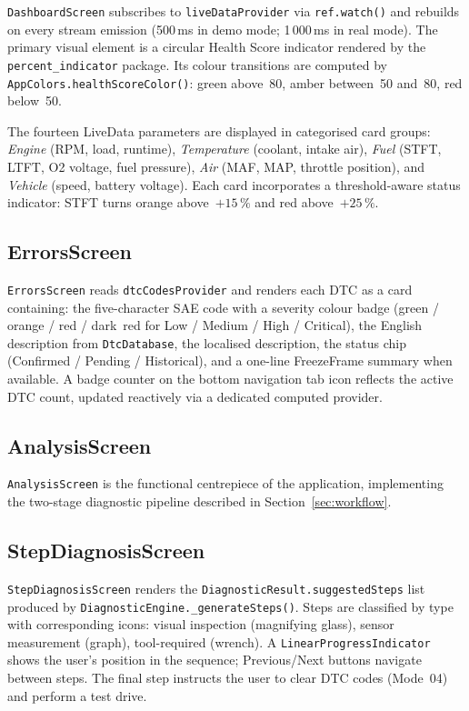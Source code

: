 \texttt{DashboardScreen} subscribes to \texttt{liveDataProvider} via \texttt{ref.watch()} and rebuilds on every stream emission (500\,ms in demo mode; 1\,000\,ms in real mode).
The primary visual element is a circular Health Score indicator rendered by the \texttt{percent\_indicator} package.
Its colour transitions are computed by \texttt{AppColors.healthScoreColor()}: green above~80, amber between~50 and~80, red below~50.

The fourteen LiveData parameters are displayed in categorised card groups:
\textit{Engine} (RPM, load, runtime),
\textit{Temperature} (coolant, intake air),
\textit{Fuel} (STFT, LTFT, O2 voltage, fuel pressure),
\textit{Air} (MAF, MAP, throttle position), and
\textit{Vehicle} (speed, battery voltage).
Each card incorporates a threshold-aware status indicator: STFT turns orange above~$+15\,\%$ and red above~$+25\,\%$.


\subsection{ErrorsScreen}

\texttt{ErrorsScreen} reads \texttt{dtcCodesProvider} and renders each DTC as a card containing: the five-character SAE code with a severity colour badge (green / orange / red / dark~red for Low / Medium / High / Critical), the English description from \texttt{DtcDatabase}, the localised description, the status chip (Confirmed / Pending / Historical), and a one-line FreezeFrame summary when available.
A badge counter on the bottom navigation tab icon reflects the active DTC count, updated reactively via a dedicated computed provider.

\subsection{AnalysisScreen}

\texttt{AnalysisScreen} is the functional centrepiece of the application, implementing the two-stage diagnostic pipeline described in Section~\ref{sec:workflow}.

\subsection{StepDiagnosisScreen}

\texttt{StepDiagnosisScreen} renders the \texttt{DiagnosticResult.suggestedSteps} list produced by \texttt{DiagnosticEngine.\_generateSteps()}.
Steps are classified by type with corresponding icons: visual inspection (magnifying glass), sensor measurement (graph), tool-required (wrench).
A \texttt{LinearProgressIndicator} shows the user's position in the sequence; Previous/Next buttons navigate between steps.
The final step instructs the user to clear DTC codes (Mode~04) and perform a test drive.


